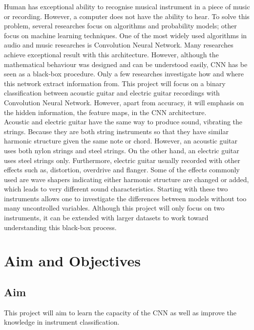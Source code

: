 \documentclass{article}
\begin{document}
Human has exceptional ability to recognise musical instrument in a piece of music or recording. However, a computer does not have the ability to hear. To solve this problem, several researches focus on algorithms and probability models; other focus on machine learning techniques. One of the most widely used algorithms in audio and music researches is Convolution Neural Network. Many researches achieve exceptional result with this architecture. However, although the mathematical behaviour was designed and can be understood easily, CNN has be seen as a black-box procedure. Only a few researches investigate how and where this network extract information from. This project will focus on a binary classification between acoustic guitar and electric guitar recordings with Convolution Neural Network. However, apart from accuracy, it will emphasis on the hidden information, the feature maps, in the CNN architecture.\\
Acoustic and electric guitar have the same way to produce sound, vibrating the strings. Because they are both string instruments so that they have similar harmonic structure given the same note or chord. However, an acoustic guitar uses both nylon strings and steel strings. On the other hand, an electric guitar uses steel strings only. Furthermore, electric guitar usually recorded with other effects such as, distortion, overdrive and flanger. Some of the effects commonly used are wave shapers indicating either harmonic structure are changed or added, which leads to very different sound characteristics. Starting with these two instruments allows one to investigate the differences between models without too many uncontrolled variables. Although this project will only focus on two instruments, it can be extended with larger datasets to work toward understanding this black-box process. 

\section{Aim and Objectives}
\subsection{Aim}
This project will aim to learn the capacity of the CNN as well as improve the knowledge in instrument classification.
\end{document}
